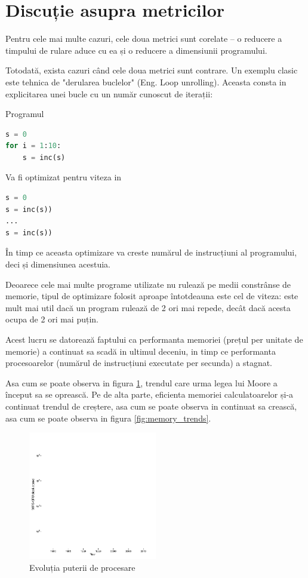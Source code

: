 \section{Discuție asupra metricilor}

Pentru cele mai multe cazuri, cele doua metrici sunt corelate --
o reducere a timpului de rulare aduce cu ea și o reducere a
dimensiunii programului.

Totodată, exista cazuri când cele doua metrici sunt contrare.
Un exemplu clasic este tehnica de "derularea buclelor" (Eng. Loop
unrolling).
Aceasta consta in explicitarea unei bucle cu un număr cunoscut
de iterații:

Programul
\begin{lstlisting}[language=Python]
s = 0
for i = 1:10:
    s = inc(s)
\end{lstlisting}

Va fi optimizat pentru viteza in
\begin{lstlisting}[language=Python]
s = 0
s = inc(s))
...
s = inc(s))
\end{lstlisting}

În timp ce aceasta optimizare va creste numărul de instrucțiuni
al programului, deci și dimensiunea acestuia.

Deoarece cele mai multe programe utilizate nu rulează pe medii
constrânse de memorie, tipul de optimizare folosit aproape
întotdeauna este cel de viteza: este mult mai util dacă un
program rulează de 2 ori mai repede, decât dacă acesta ocupa de
2 ori mai puțin.

Acest lucru se datorează faptului ca performanta memoriei (prețul
per unitate de memorie) a continuat sa scadă in ultimul deceniu,
in timp ce performanta procesoarelor (numărul de instrucțiuni
executate per secunda) a stagnat.

Asa cum se poate observa in figura \ref{fig:cpu_and_gpu_trends},
trendul care urma legea lui Moore \cite{moores_law} a început sa
se oprească. Pe de alta parte, eficienta memoriei calculatoarelor
și-a continuat trendul de creștere, asa cum se poate observa in
continuat sa crească, asa cum se poate observa in figura
\ref{fig:memory_trends}.

\begin{figure}
	\centering
	\includegraphics[width=0.5\textwidth]{cpu_and_gpu_trends}
	\caption{Evoluția puterii de procesare\cite{cpu_and_gpu_trends} }
	\label{fig:cpu_and_gpu_trends}
\end{figure}

